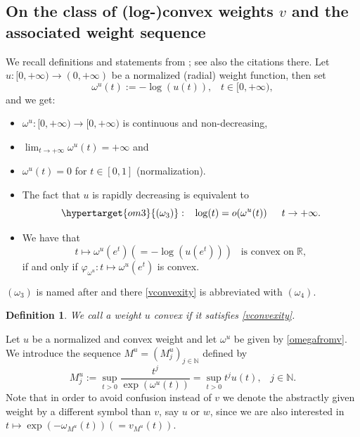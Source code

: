 \documentclass[10pt]{amsart}%
\numberwithin{equation}{section}
\theoremstyle{plain}
\newtheorem{definition}[proposition]{Definition}
\newcommand{\RR}{\mathbb{R}}
\newcommand{\NN}{\mathbb{N}}
\begin{document}
\subsection{On the class of (log-)convex weights $v$ and the associated weight sequence}\label{convexsection}
We recall definitions and statements from \cite[Sect. 2.6 \& 2.7]{weightedentirecharacterization}; see also the citations there. Let $u:[0,+\infty)\rightarrow(0,+\infty)$ be a normalized (radial) weight function, then set
\begin{equation}\label{omegafromv}
\omega^u(t):=-\log(u(t)),\;\;\;t\in[0,+\infty),
\end{equation}
and we get:
\begin{itemize}
\item[$(*)$] $\omega^u:[0,+\infty)\rightarrow[0,+\infty)$ is continuous and non-decreasing,

\item[$(*)$] $\lim_{t\rightarrow+\infty}\omega^u(t)=+\infty$ and

\item[$(*)$] $\omega^u(t)=0$ for $t\in[0,1]$ (normalization).

\item[$(*)$] The fact that $u$ is rapidly decreasing is equivalent to
$$\hypertarget{om3}{(\omega_3)}:\;\;\;\log(t)=o(\omega^u(t))\hspace{15pt}t\rightarrow+\infty.$$

\item[$(*)$] We have that
\begin{equation}\label{vconvexity}
t\mapsto\omega^u(e^t)(=-\log(u(e^t)))\;\;\;\text{is convex on}\;\RR,
\end{equation}
if and only if $\varphi_{\omega^u}: t\mapsto\omega^u(e^t)$ is convex.
\end{itemize}

\hyperlink{om3}{$(\omega_3)$} is named after \cite{dissertation} and there \eqref{vconvexity} is abbreviated with $(\omega_4)$.

\begin{definition}\label{admissdef}
We call a weight $u$ {\itshape convex} if it satisfies \eqref{vconvexity}.
\end{definition}

Let $u$ be a normalized and convex weight and let $\omega^u$ be given by \eqref{omegafromv}. We introduce the sequence $M^u=(M^u_j)_{j\in\NN}$ defined by
\begin{equation}\label{vBMTweight1equ1}
M^u_j:=\sup_{t>0}\frac{t^j}{\exp(\omega^u(t))}=\sup_{t>0}t^ju(t),\;\;\;j\in\NN.
\end{equation}
Note that in order to avoid confusion instead of $v$ we denote the abstractly given weight by a different symbol than $v$, say $u$ or $w$, since we are also interested in $t\mapsto\exp(-\omega_{M^u}(t))(=v_{M^u}(t))$.\vspace{6pt}
\end{document}
